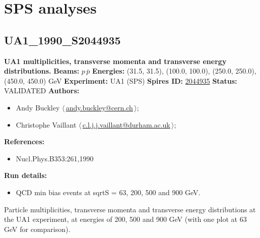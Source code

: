 \section{SPS analyses}\subsection[UA1\_1990\_S2044935]{UA1\_1990\_S2044935\,\cite{Albajar:1989an}}
\textbf{UA1 multiplicities, transverse momenta and transverse energy distributions.}\newline
\textbf{Beams:} $p$\,$\bar{p}$ \newline
\textbf{Energies:} (31.5, 31.5), (100.0, 100.0), (250.0, 250.0), (450.0, 450.0) GeV \newline
\textbf{Experiment:} UA1 (SPS) \newline
\textbf{Spires ID:} \href{http://www.slac.stanford.edu/spires/find/hep/www?rawcmd=key+2044935}{2044935}\newline
\textbf{Status:} VALIDATED\newline
\textbf{Authors:}
\begin{itemize}
  \item Andy Buckley $\langle\,$\href{mailto:andy.buckley@cern.ch}{andy.buckley@cern.ch}$\,\rangle$;
  \item Christophe Vaillant $\langle\,$\href{mailto:c.l.j.j.vaillant@durham.ac.uk}{c.l.j.j.vaillant@durham.ac.uk}$\,\rangle$;
\end{itemize}
\textbf{References:}
\begin{itemize}
  \item Nucl.Phys.B353:261,1990
\end{itemize}
\textbf{Run details:}
\begin{itemize}

  \item QCD min bias events at sqrtS = 63, 200, 500 and 900 GeV.\end{itemize}

\noindent Particle multiplicities, transverse momenta and transverse energy distributions at the UA1 experiment, at energies of 200, 500 and 900 GeV (with one plot at 63 GeV for comparison).

\clearpage


\clearpage

